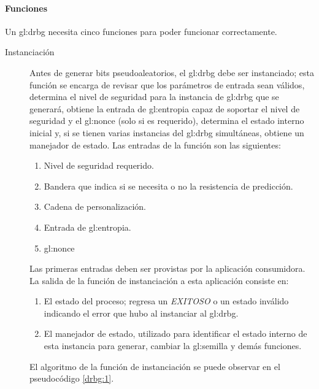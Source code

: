 %
%

\paragraph{Funciones}

Un \gls{gl:drbg} necesita cinco funciones para poder funcionar correctamente.
\begin{description}
  \item [Instanciación] Antes de generar bits pseudoaleatorios, el \gls{gl:drbg}
    debe ser instanciado; esta función se encarga de revisar que los parámetros
    de entrada sean válidos, determina  el nivel de seguridad para la instancia
    de \gls{gl:drbg} que se generará, obtiene la entrada de \gls{gl:entropia}
    capaz de soportar el nivel de seguridad y el \gls{gl:nonce} (solo si es
    requerido), determina el estado interno inicial y, si se tienen varias
    instancias del \gls{gl:drbg} simultáneas, obtiene un manejador de estado.
    Las entradas de la función son las siguientes:
    \begin{enumerate}
      \item Nivel de seguridad requerido.
      \item Bandera que indica si se necesita o no la resistencia de predicción.
      \item Cadena de personalización.
      \item Entrada de \gls{gl:entropia}.
      \item \gls{gl:nonce}
    \end{enumerate}
    Las primeras entradas deben ser provistas por la aplicación consumidora. La
    salida de la función de instanciación a esta aplicación consiste en:
    \begin{enumerate}
      \item El estado del proceso; regresa un \textit{EXITOSO} o un estado
        inválido indicando el error que hubo al instanciar al \gls{gl:drbg}.
      \item El manejador de estado, utilizado para identificar el estado interno
        de esta instancia para generar, cambiar la \gls{gl:semilla} y demás
        funciones.
    \end{enumerate}
    El algoritmo de la función de instanciación se puede observar en el
    pseudocódigo \ref{drbg:1}.


\end{description}
